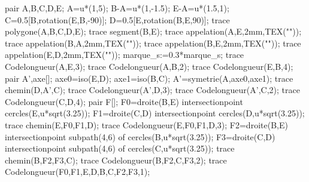 \begin{methode*1}
\begin{multicols}{3}
\begin{itemize}
                \vspace*{-15mm}
                \begin{Geometrie}
                    pair A,B,C,D,E;
                    A=u*(1,5);
                    B-A=u*(1,-1.5);
                    E-A=u*(1.5,1);
                    C=0.5[B,rotation(E,B,-90)];
                    D=0.5[E,rotation(B,E,90)];
                    trace polygone(A,B,C,D,E);
                    trace segment(B,E);
                    trace appelation(A,E,2mm,TEX("\tiny{}"));
                    trace appelation(B,A,2mm,TEX("\tiny{}"));
                    trace appelation(B,E,2mm,TEX("\tiny{}"));
                    trace appelation(E,D,2mm,TEX("\tiny{}"));
                    marque_s:=0.3*marque_s;
                    trace Codelongueur(A,E,3);
                    trace Codelongueur(A,B,2);
                    trace Codelongueur(E,B,4);
                    pair A',axe[];
                    axe0=iso(E,D);
                    axe1=iso(B,C);
                    A'=symetrie(A,axe0,axe1);
                    trace chemin(D,A',C);
                    trace Codelongueur(A',D,3);
                    trace Codelongueur(A',C,2);
                    trace Codelongueur(C,D,4);
                    pair F[];
                    F0=droite(B,E) intersectionpoint cercles(E,u*sqrt(3.25));
                    F1=droite(C,D) intersectionpoint cercles(D,u*sqrt(3.25));
                    trace chemin(E,F0,F1,D);
                    trace Codelongueur(E,F0,F1,D,3);
                    F2=droite(B,E) intersectionpoint subpath(4,6) of cercles(B,u*sqrt(3.25));
                    F3=droite(C,D) intersectionpoint subpath(4,6) of cercles(C,u*sqrt(3.25));
                    trace chemin(B,F2,F3,C);
                    trace Codelongueur(B,F2,C,F3,2);
                    trace Codelongueur(F0,F1,E,D,B,C,F2,F3,1);
                \end{Geometrie}
            \end{itemize}
        \end{multicols}
        \vspace*{-15mm}
    \end{methode*1}
